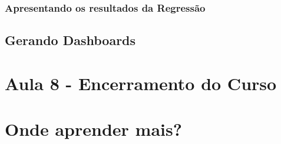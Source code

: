 \documentclass[12pt,a4paper,oneside]{erdc}
\begin{document}
\subsection{Apresentando os resultados da Regressão}

\section{Gerando Dashboards}

\chapter{Aula 8 - Encerramento do Curso}


\chapter{Onde aprender mais?}


  
  
  

%








\end{document}
